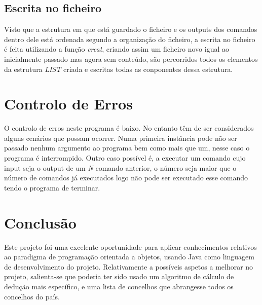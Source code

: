 \subsection{Escrita no ficheiro}
Visto que a estrutura em que está guardado o ficheiro e os outputs dos comandos dentro dele está ordenada segundo a organização do ficheiro, a escrita no ficheiro é feita utilizando a função \textit{\textit{creat}}, criando assim um ficheiro novo igual ao inicialmente passado mas agora sem conteúdo, são percorridos todos os elementos da estrutura \textit{LIST} criada e escritas todas as conponentes dessa estrutura.

\section{Controlo de Erros}

O controlo de erros neste programa é baixo. No entanto têm de ser considerados alguns cenários que possam ocorrer. Numa primeira instância pode não ser passado nenhum argumento ao programa bem como mais que um, nesse caso o programa é interrompido. Outro caso possível é, a executar um comando cujo input seja o output de um \textit{N} comando anterior, o número seja maior que o número de comandos já executados logo não pode ser executado esse comando tendo o programa de terminar.

\section{Conclusão}
Este projeto foi uma excelente oportunidade para aplicar conhecimentos relativos ao paradigma de programação orientada a objetos, usando Java como linguagem de desenvolvimento do projeto. Relativamente a possíveis aspetos a melhorar no projeto, salienta-se que poderia ter sido usado um algoritmo de cálculo de dedução mais específico, e uma lista de concelhos que abrangesse todos os concelhos do país.

